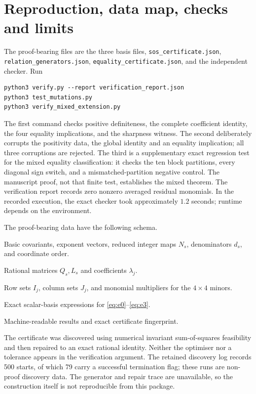 \documentclass[11pt,a4paper]{article}
\theoremstyle{remark}\newtheorem{remark}[theorem]{Remark}
\begin{document}
\section{Reproduction, data map, checks and limits}
The proof-bearing files are the three basis files, \nolinkurl{sos_certificate.json}, \nolinkurl{relation_generators.json}, \nolinkurl{equality_certificate.json}, and the independent checker. Run
\begin{verbatim}
python3 verify.py --report verification_report.json
python3 test_mutations.py
python3 verify_mixed_extension.py
\end{verbatim}
The first command checks positive definiteness, the complete coefficient identity, the four equality implications, and the sharpness witness. The second deliberately corrupts the positivity data, the global identity and an equality implication; all three corruptions are rejected. The third is a supplementary exact regression test for the mixed equality classification: it checks the ten block partitions, every diagonal sign switch, and a mismatched-partition negative control. The manuscript proof, not that finite test, establishes the mixed theorem. The verification report records zero nonzero averaged residual monomials. In the recorded execution, the exact checker took approximately $1.2$ seconds; runtime depends on the environment.

The proof-bearing data have the following schema.
\begin{description}[style=nextline,leftmargin=1em,labelindent=0pt,itemsep=2pt]
\item[\nolinkurl{certificate_basis0.json}, \nolinkurl{certificate_basis1.json}, \nolinkurl{certificate_basis2.json}]
Basic covariants, exponent vectors, reduced integer maps $N_s$, denominators $d_s$, and coordinate order.
\item[\nolinkurl{sos_certificate.json}]
Rational matrices $Q_s,L_s$ and coefficients $\lambda_j$.
\item[\nolinkurl{relation_generators.json}]
Row sets $I_j$, column sets $J_j$, and monomial multipliers for the $4\times4$ minors.
\item[\nolinkurl{equality_certificate.json}]
Exact scalar-basis expressions for \eqref{eq:e0}--\eqref{eq:e3}.
\item[\nolinkurl{verification_report.json}]
Machine-readable results and exact certificate fingerprint.
\end{description}

The certificate was discovered using numerical invariant sum-of-squares feasibility and then repaired to an exact rational identity. Neither the optimiser nor a tolerance appears in the verification argument. The retained discovery log records 500 starts, of which 79 carry a successful termination flag; these runs are non-proof discovery data. The generator and repair trace are unavailable, so the construction itself is not reproducible from this package.
\end{document}
